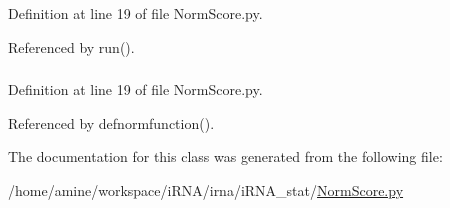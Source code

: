 \-Definition at line 19 of file \-Norm\-Score.\-py.



\-Referenced by run().

\hypertarget{classirna_1_1iRNA__stat_1_1NormScore_1_1NormScore_ac8f2146fde80e80b1b11fc09fdcc33ab}{
\subsubsection[{type\-\_\-sol}]{}}
\label{classirna_1_1iRNA__stat_1_1NormScore_1_1NormScore_ac8f2146fde80e80b1b11fc09fdcc33ab}


\-Definition at line 19 of file \-Norm\-Score.\-py.



\-Referenced by defnormfunction().



\-The documentation for this class was generated from the following file\-:\begin{DoxyCompactItemize}
\item 
/home/amine/workspace/i\-R\-N\-A/irna/i\-R\-N\-A\-\_\-stat/\hyperlink{NormScore_8py}{\-Norm\-Score.\-py}\end{DoxyCompactItemize}
